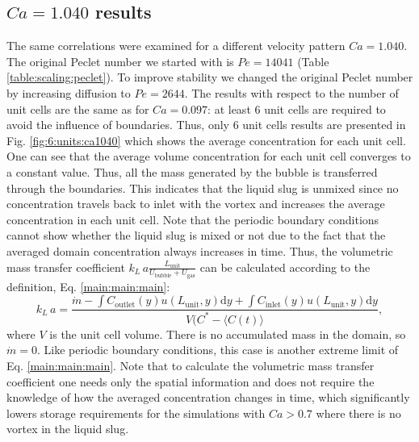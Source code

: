 \documentclass{article}
\newcommand{\beq}{\begin{equation}}
\newcommand{\feq}{\end{equation}}
\newcommand{\vol}{k_L\,a}
\newcommand{\lunit}{L_{\mathrm{unit}}}
\newcommand{\ububble}{U_{\mathrm{bubble}}}
\newcommand{\ugas}{U_{\mathrm{gas}}}
\newcommand{\cinlet}{C_{\mathrm{inlet}}}
\newcommand{\coutlet}{C_{\mathrm{outlet}}}
\newcommand{\cstar}{C^{*}}
\newcommand{\volnondim}{\vol \frac{\lunit}{\ububble+\ugas}}
\begin{document}
\subsection{$Ca=1.040$ results}
The same correlations were examined for a different velocity pattern $Ca=1.040$. %
The original Peclet number we started with is $Pe=14041$ (Table \ref{table:scaling:peclet}).
To improve stability we changed the original Peclet number by increasing
diffusion to $Pe=2644$. The results with respect to the number of unit cells are the same as for $Ca=0.097$:
at least $6$ unit cells are required to avoid the influence of boundaries. Thus,
only $6$ unit cells results are presented in Fig. \ref{fig:6:units:ca1040} which shows the
average concentration for each unit cell. One can see that the average volume concentration for each unit cell converges to
a constant value. Thus, all the
mass generated by the bubble is transferred through the boundaries. This indicates that the
liquid slug is unmixed since no concentration travels back to inlet with the vortex and increases the average concentration in each unit cell. Note that the periodic boundary conditions cannot show whether the
liquid slug is mixed or not due to the fact that the averaged domain concentration always increases in time. 
Thus, the volumetric mass transfer coefficient $\volnondim$ can be calculated according to the
definition, Eq. \ref{main:main:main}:
\beq
\label{inlet:outlet:spatial:location}
\vol =
\frac{\dot{m}-\int{\coutlet(y)u(\lunit,y)\mathrm{d}y}+\int{\cinlet(y)u(\lunit,y)\mathrm{d}y}}{V
(\cstar - \langle C(t) \rangle},
\feq 
where $V$ is the unit cell volume. There is no accumulated mass in the domain, so $\dot{m}=0$. Like periodic boundary
conditions, this case is another extreme limit of Eq. \ref{main:main:main}. Note that to calculate
the volumetric mass transfer coefficient one needs only the spatial information and does not
require the knowledge of how the averaged concentration changes in time, which significantly
lowers storage requirements for the simulations with $Ca>0.7$ where there is no vortex in the
liquid slug. 
\end{document}
